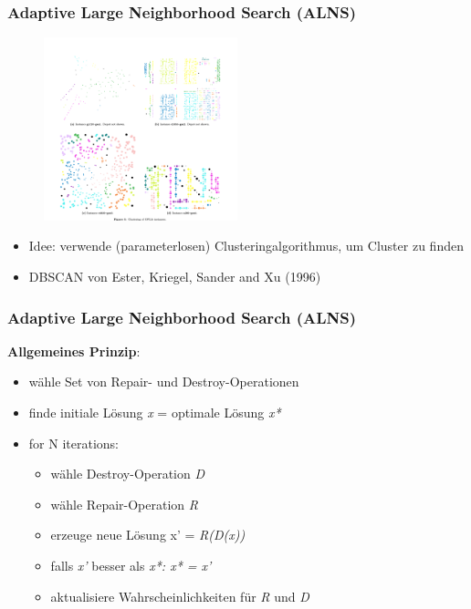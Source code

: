 \documentclass{beamer}
\begin{document}
\begin{frame}
  \frametitle{Adaptive Large Neighborhood Search (ALNS)}
  \centering
  \begin{figure}
    \includegraphics[width=0.5\textwidth]{img/clusters.png}
  \end{figure}
  \begin{itemize}
      \item Idee: verwende (parameterlosen) Clusteringalgorithmus, um Cluster zu finden
      \item DBSCAN von Ester, Kriegel, Sander and Xu (1996)
  \end{itemize}
\end{frame}

\begin{frame}
  \frametitle{Adaptive Large Neighborhood Search (ALNS)}
  \textbf{Allgemeines Prinzip}:
  \begin{itemize}
    \item wähle Set von Repair- und Destroy-Operationen
    \item finde initiale Lösung \textit{x} = optimale Lösung \textit{x*}
    \item for N iterations:
    \begin{itemize}
        \item wähle Destroy-Operation \textit{D}
        \item wähle Repair-Operation \textit{R}
        \item erzeuge neue Lösung x' = \textit{R(D(x))}
        \item falls \textit{x'} besser als \textit{x*: x* = x'}
        \item aktualisiere Wahrscheinlichkeiten für \textit{R} und \textit{D}
    \end{itemize}
  \end{itemize}
\end{frame}
\end{document}
